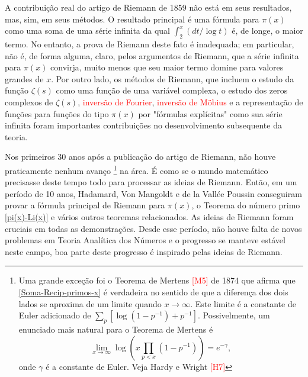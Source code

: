     A contribuição real do artigo de Riemann de 1859 não está em 
    seus resultados, mas, sim, em seus métodos. 
    O resultado principal é uma fórmula para $\pi(x)$ como uma soma de 
    uma série infinita da qual $\int_{2}^{x}(dt/\log t)$ é, de longe, o maior termo. 
    No entanto, a prova de Riemann deste fato é inadequada; 
    em particular, não é, de forma alguma, claro, pelos argumentos de Riemann, 
    que a série infinita para $\pi(x)$ convirja, muito menos que seu maior 
    termo domine para valores grandes de $x$. Por outro lado, os métodos de Riemann, 
    que incluem o estudo da função $\zeta(s)$ como uma função de uma variável complexa, 
    o estudo dos zeros complexos de $\zeta(s)$, \textcolor{red}{inversão de Fourier}, 
    \textcolor{red}{inversão de Möbius} e a representação de funções para 
    funções do tipo $\pi(x)$ por "fórmulas explícitas" como sua série 
    infinita foram importantes contribuições no desenvolvimento subsequente da teoria.
    
    Nos primeiros 30 anos após a publicação do artigo de Riemann, não houve praticamente nenhum avanço
    \footnote{ Uma grande exceção foi o Teorema de Mertens 
    \textcolor{red}{[M5]} de 1874 que afirma que \eqref{Soma-Recip-primos-x} 
    é verdadeira no sentido de que a diferença dos dois lados se 
    aproxima de um limite quando $x \to \infty$. Este limite é a 
    constante de Euler adicionado de $\sum_{p}[\log(1-p^{-1}) + p^{-1}]$. 
    Possivelmente, um enunciado mais natural para o Teorema de Mertens é 
    $$\lim_{x \to \infty} \log \left( x \prod_{p<x}(1-p^{-1}) \right) = e^{-\gamma},$$
    onde $\gamma$ é a constante de Euler. Veja Hardy e Wright \textcolor{red}{[H7]}}
    na área. É como se o mundo matemático precisasse deste tempo 
    todo para processar as ideias de Riemann. Então, em um período de 10 anos, 
    Hadamard, Von Mangoldt e de la Vallée Poussin conseguiram provar a 
    fórmula principal de Riemann para $\pi(x)$, o 
    Teorema do número primo \eqref{pi(x)-Li(x)} e vários outros 
    teoremas relacionados. As ideias de Riemann foram cruciais em 
    todas as demonstrações. Desde esse período, não houve falta de 
    novos problemas em Teoria Analítica dos Números e o progresso 
    se manteve estável neste campo, boa parte deste progresso é 
    inspirado pelas ideias de Riemann. 
    

